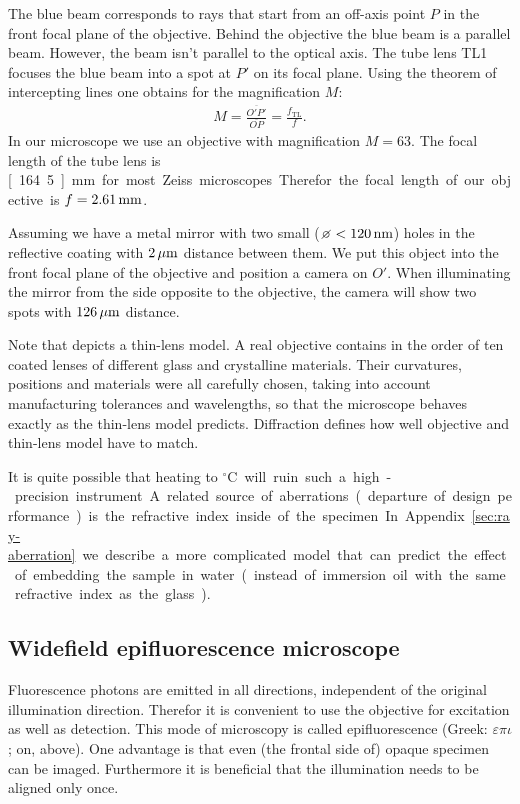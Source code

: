 The blue beam corresponds to rays that start from an off-axis point
$P$ in the front focal plane of the objective. Behind the objective
the blue beam is a parallel beam. However, the beam isn't parallel to
the optical axis. The tube lens TL1 focuses the blue beam into a spot
at $P'$ on its focal plane. Using the theorem of intercepting lines
one obtains for the magnification $M$:
\begin{align}
  M=\frac{\overline{O'P'}}{\overline{OP}}=\frac{f_\textrm{TL}}{f}.
\end{align}
In our microscope we use an objective with magnification $M=63$. The
focal length of the tube lens is \unit[164.5]{mm} for most Zeiss
microscopes. Therefor the focal length of our objective is
$f=\unit[2.61]{mm}$.

Assuming we have a metal mirror with two small
($\diameter<\unit[120]{nm}$) holes in the reflective coating with
$\unit[2]{\mu m}$ distance between them.  We put this object into the
front focal plane of the objective and position a camera on $O'$. When
illuminating the mirror from the side opposite to the objective, the
camera will show two spots with $\unit[126]{\mu m}$ distance.

Note that  depicts a thin-lens
model. A real objective contains in the order of ten coated lenses of
different glass and crystalline materials. Their curvatures, positions
and materials were all carefully chosen, taking into account
manufacturing tolerances and wavelengths, so that the microscope
behaves exactly as the thin-lens model predicts. Diffraction defines
how well objective and thin-lens model have to match.

It is quite possible that heating to \unit[37]{${}^\circ$C} will ruin
such a high-precision instrument. A related source of aberrations
(departure of design performance) is the refractive index inside of
the specimen. In Appendix~\ref{sec:ray-aberration} we describe a more
complicated model that can predict the effect of embedding the sample
in water (instead of immersion oil with the same refractive index as
the glass).

\subsection{Widefield epifluorescence microscope}
Fluorescence photons are emitted in all directions, independent of the
original illumination direction. Therefor it is convenient to use the
objective for excitation as well as detection. This mode of microscopy
is called epifluorescence (Greek: $\varepsilon\pi\iota$; on, above).
One advantage is that even (the frontal side of) opaque specimen can
be imaged. Furthermore it is beneficial that the illumination needs to
be aligned only once.

